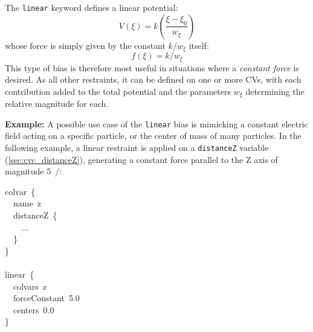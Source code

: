 The \texttt{linear} keyword defines a linear potential:
\begin{equation}
  \label{eq:colvarbias_linear}
  V\left(\xi\right) = k \left(\frac{\xi - \xi_0}{w_{\xi}}\right)
\end{equation}
\noindent{}whose force is simply given by the constant $k/w_\xi$ itself:
\begin{equation}
  \label{eq:colvarbias_linear_force}
  f(\xi) = k/w_\xi
\end{equation}
\noindent{}This type of bias is therefore most useful in situations where a \emph{constant force} is desired.  As all other restraints, it can be defined on one or more CVs, with each contribution added to the total potential and the parameters $w_\xi$ determining the relative magnitude for each.

\noindent\textbf{Example:} A possible use case of the \texttt{linear} bias is mimicking a constant electric field acting on a specific particle, or the center of mass of many particles.  In the following example, a linear restraint is applied on a \texttt{distanceZ} variable (\ref{sec:cvc_distanceZ}), generating a constant force parallel to the Z axis of magnitude 5~\energyunit/\lengthunit{}:
\begin{cvexampleinput}
\-colvar~\{\\
\-~~name~z\\
\-~~distanceZ~\{\\
\-~~~~...\\
\-~~\}\\
\-\}\\
\-\\
\-linear~\{\\
\-~~colvars~z\\
\-~~forceConstant~5.0\\
\-~~centers~0.0\\
\}
\end{cvexampleinput}

